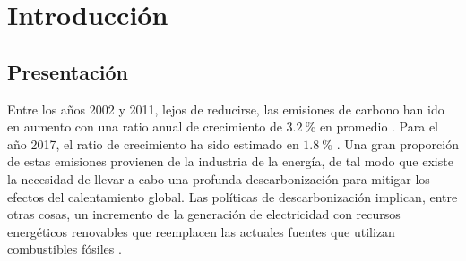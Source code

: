 

\chapter{Introducción}


\section{Presentación} %

Entre los años 2002 y 2011, lejos de reducirse, las emisiones de carbono han ido en aumento  con una ratio anual de crecimiento de $3.2\ \%$ en promedio \citep[p.~50]{stocker_climate_2013}. Para el año 2017, el ratio de crecimiento ha sido estimado en $1.8\ \%$ \citep[p.~2]{peters_towards_2017}. Una gran proporción de estas emisiones provienen de la industria de la energía, de tal modo que existe la necesidad de llevar a cabo una profunda descarbonización para mitigar los efectos del calentamiento global. Las políticas de descarbonización  implican, entre otras cosas, un incremento de la generación de electricidad con recursos energéticos renovables que reemplacen  las actuales fuentes que utilizan combustibles fósiles \citep[p.~3]{duan_modeling_2020}.

